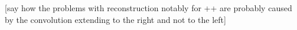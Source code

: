 \documentclass[aps,showpacs,twocolumn,
prd,superscriptaddress,nofootinbib]{revtex4-1}
\newcommand\calT{{\mathcal{T}}}
\newcommand{\SM}[1]{{\color{Red} #1}}
\begin{document}

\SM{[say how the problems with reconstruction notably for ++ are probably caused by the convolution extending to the right and not to the left]}

\end{document}
